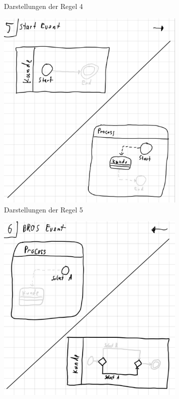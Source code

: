 \begin{figure}
\begin{subfigure}{0.4\textwidth}
        \caption{Darstellungen der Regel 4}%
        \label{fig:ruleExample4}
    \end{subfigure}
    \begin{subfigure}{0.4\textwidth}
        \vspace{20pt}
        \centering
        \includegraphics[width=\textwidth,keepaspectratio]{../images/rule/rule5.jpg}%
        \caption{Darstellungen der Regel 5}%
        \label{fig:ruleExample5}
    \end{subfigure}
    \hfill
    \begin{subfigure}{0.4\textwidth}
        \vspace{20pt}
        \centering
        \includegraphics[width=\textwidth,keepaspectratio]{../images/rule/rule6.jpg}%

\end{subfigure}
\end{figure}
